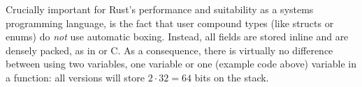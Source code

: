 Crucially important for Rust's performance and suitability as a systems programming language, is the fact that user compound types (like structs or enums) do \emph{not} use automatic boxing.
Instead, all fields are stored inline and are densely packed, as in \cpp or C.
As a consequence, there is virtually no difference between using two  variables, one \code{[f32; 2]} variable or one  (example code above) variable in a function: all versions will store $2 \cdot 32 = 64$ bits on the stack.




